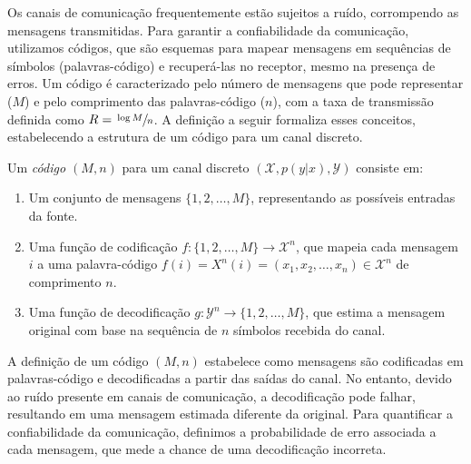 Os canais de comunicação frequentemente estão sujeitos a ruído, corrompendo as
mensagens transmitidas. Para garantir a confiabilidade da comunicação,
utilizamos códigos, que são esquemas para mapear mensagens em sequências
de símbolos (palavras-código) e recuperá-las no receptor, mesmo na presença de
erros. Um código é caracterizado pelo número de mensagens que pode representar
($M$) e pelo comprimento das palavras-código ($n$), com a taxa de transmissão
definida como $R = \sfrac{\log M }{n}$. A definição a seguir formaliza esses conceitos,
estabelecendo a estrutura de um código para um canal discreto.


\begin{definition}[Código $(M,n)$]
  Um \emph{código $(M,n)$} para um canal discreto $(\mathcal{X}, p(y|x), \mathcal{Y})$ consiste em:
\begin{enumerate}
  \item Um conjunto de mensagens $\{1, 2, \ldots, M\}$, representando as possíveis entradas da fonte.
  \item Uma função de codificação $f: \{1, 2, \ldots, M\} \to \mathcal{X}^n$, que mapeia cada mensagem $i$ a uma palavra-código $f(i) = X^n(i) = (x_1, x_2, \ldots, x_n) \in \mathcal{X}^n$ de comprimento $n$.
  \item Uma função de decodificação $g: \mathcal{Y}^n \to \{1, 2, \ldots, M\}$, que estima a mensagem original com base na sequência de $n$ símbolos recebida do canal.
\end{enumerate}
\end{definition}


A definição de um código $(M,n)$ estabelece como mensagens são codificadas em
palavras-código e decodificadas a partir das saídas do canal. No entanto,
devido ao ruído presente em canais de comunicação, a decodificação pode falhar,
resultando em uma mensagem estimada diferente da original. Para quantificar a
confiabilidade da comunicação, definimos a probabilidade de erro associada a cada
mensagem, que mede a chance de uma decodificação incorreta. 

